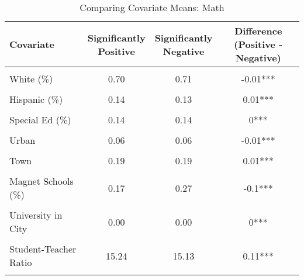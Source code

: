 \begin{table}[!h]
\centering
\caption{\label{tab:cov_means_math_all}Comparing Covariate Means: Math}
\centering
\begin{tabular}[t]{lccc}
\toprule
Covariate & \makecell[c]{Significantly\\Positive} & \makecell[c]{Significantly\\Negative} & \makecell[c]{Difference\\(Positive - Negative)}\\
\midrule
\cellcolor{gray!10}{Log of Enrollment} & \cellcolor{gray!10}{7.45} & \cellcolor{gray!10}{7.49} & \cellcolor{gray!10}{-0.04***}\\
White (\%) & 0.70 & 0.71 & -0.01***\\
\cellcolor{gray!10}{Black (\%)} & \cellcolor{gray!10}{0.08} & \cellcolor{gray!10}{0.08} & \cellcolor{gray!10}{0***}\\
Hispanic (\%) & 0.14 & 0.13 & 0.01***\\
\cellcolor{gray!10}{Free/Reduced Lunch (\%)} & \cellcolor{gray!10}{0.48} & \cellcolor{gray!10}{0.48} & \cellcolor{gray!10}{0.01***}\\
Special Ed (\%) & 0.14 & 0.14 & 0***\\
\cellcolor{gray!10}{Baseline Performance} & \cellcolor{gray!10}{0.10} & \cellcolor{gray!10}{0.13} & \cellcolor{gray!10}{-0.04***}\\
Urban & 0.06 & 0.06 & -0.01***\\
\cellcolor{gray!10}{Suburb} & \cellcolor{gray!10}{0.27} & \cellcolor{gray!10}{0.28} & \cellcolor{gray!10}{0***}\\
Town & 0.19 & 0.19 & 0.01***\\
\cellcolor{gray!10}{Rural} & \cellcolor{gray!10}{0.47} & \cellcolor{gray!10}{0.47} & \cellcolor{gray!10}{0***}\\
Magnet Schools (\%) & 0.17 & 0.27 & -0.1***\\
\cellcolor{gray!10}{City Population (standardized)} & \cellcolor{gray!10}{0.00} & \cellcolor{gray!10}{0.00} & \cellcolor{gray!10}{0***}\\
University in City & 0.00 & 0.00 & 0***\\
\cellcolor{gray!10}{Per Pupil Revenue} & \cellcolor{gray!10}{13340.23} & \cellcolor{gray!10}{13362.44} & \cellcolor{gray!10}{-22.21**}\\
Student-Teacher Ratio & 15.24 & 15.13 & 0.11***\\
\cellcolor{gray!10}{Teacher Salary} & \cellcolor{gray!10}{94666.86} & \cellcolor{gray!10}{94338.90} & \cellcolor{gray!10}{327.97***}\\

\end{tabular}
\end{table}
